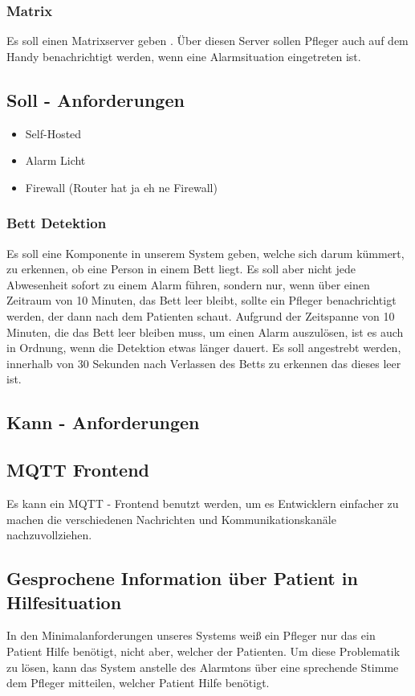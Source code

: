 \subsubsection{Matrix}
Es soll einen Matrixserver geben \cite{Matrix} . Über diesen Server sollen Pfleger auch auf dem Handy benachrichtigt werden, wenn eine Alarmsituation eingetreten ist. 


\subsection{Soll - Anforderungen}
\begin{itemize}
  \item Self-Hosted
  \item Alarm Licht
  \item Firewall (Router hat ja eh ne Firewall)
\end{itemize}

\subsubsection{Bett Detektion}
Es soll eine Komponente in unserem System geben, welche sich darum kümmert, zu erkennen, ob eine Person in einem Bett liegt. Es soll aber nicht jede Abwesenheit sofort zu einem Alarm führen, sondern nur, wenn über einen Zeitraum von 10 Minuten, das Bett leer bleibt, sollte ein Pfleger benachrichtigt werden, der dann nach dem Patienten schaut. Aufgrund der Zeitspanne von 10 Minuten, die das Bett leer bleiben muss, um einen Alarm auszulösen, ist es auch in Ordnung, wenn die Detektion etwas länger dauert. Es soll angestrebt werden, innerhalb von 30 Sekunden nach Verlassen des Betts zu erkennen das dieses leer ist. 

\subsection{Kann - Anforderungen}

\subsection{MQTT Frontend}
Es kann ein MQTT - Frontend benutzt werden, um es Entwicklern einfacher zu machen die verschiedenen Nachrichten und Kommunikationskanäle nachzuvollziehen. 

\subsection{Gesprochene Information über Patient in Hilfesituation}
In den Minimalanforderungen unseres Systems weiß ein Pfleger nur das ein Patient Hilfe benötigt, nicht aber, welcher der Patienten. Um diese Problematik zu lösen, kann das System anstelle des Alarmtons über eine sprechende Stimme dem Pfleger mitteilen, welcher Patient Hilfe benötigt. 

